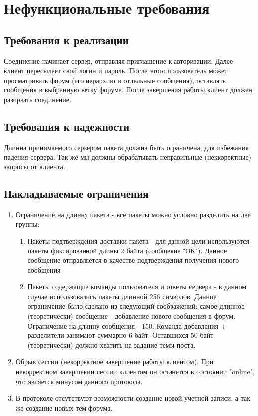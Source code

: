 \documentclass[10pt,a4paper]{report}
\begin{document}
\chapter{Нефункциональные требования}
\section{Требования к реализации}
Соединение начинает сервер, отправляя приглашение к авторизации. Далее клиент пересылает свой логин и пароль. После этого пользователь может просматривать форум (его иерархию и отдельные сообщения), оставлять сообщения в выбранную ветку форума. После завершения работы клиент должен разорвать соединение.
\section{Требования к надежности}
Длинна принимаемого сервером пакета должна быть ограничена, для избежания падения сервера. Так же мы должны обрабатывать неправильные (неккоректные) запросы от клиента.
\section{Накладываемые ограничения}
\begin{enumerate}
\item Ограничение на длинну пакета - все пакеты можно условно разделить на две группы:
\begin{enumerate}
\item Пакеты подтверждения доставки пакета - для данной цели используются пакеты фиксированной длины 2 байта (сообщение "ОК"). Данное сообщение отправляется в качестве подтверждения получения нового сообщения
\item Пакеты содержащие команды пользователя и ответы сервера - в данном случае использовались пакеты длинной 256 символов. Данное ограничение было сделано из следующий соображений: самое длинное (теоретически) сообщение - добавление нового сообщения в форум. Ограничение на длинну сообщения - 150. Команда добавления + разделители занимают суммарно 6 байт. Оставшихся 50 байт (теоретически) должно хватить на задание темы поста.
\end{enumerate}
\item Обрыв сессии (некорректное завершение работы клиентом). При некорректном завершении сессии клиентом он останется в состоянии "online", что является минусом данного протокола.
\item В протоколе отсутствуют возможности создание новой учетной записи, а так же создание новых тем форума.
\end{enumerate}
\end{document}
